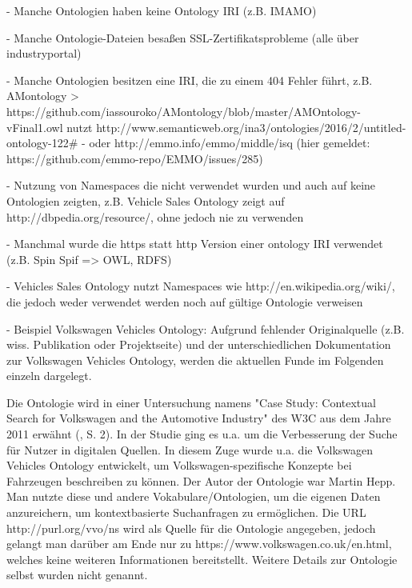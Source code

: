 \documentclass{article}
\begin{document}
- Manche Ontologien haben keine Ontology IRI (z.B. IMAMO)

- Manche Ontologie-Dateien besaßen SSL-Zertifikatsprobleme (alle über industryportal)

- Manche Ontologien besitzen eine IRI, die zu einem 404 Fehler führt, z.B. AMontology > https://github.com/iassouroko/AMontology/blob/master/AMOntology-vFinal1.owl nutzt http://www.semanticweb.org/ina3/ontologies/2016/2/untitled-ontology-122\#
  - oder http://emmo.info/emmo/middle/isq (hier gemeldet: https://github.com/emmo-repo/EMMO/issues/285)

- Nutzung von Namespaces die nicht verwendet wurden und auch auf keine Ontologien zeigten, z.B. Vehicle Sales Ontology zeigt auf http://dbpedia.org/resource/, ohne jedoch nie zu verwenden

- Manchmal wurde die https statt http Version einer ontology IRI verwendet (z.B. Spin Spif => OWL, RDFS)

- Vehicles Sales Ontology nutzt Namespaces wie http://en.wikipedia.org/wiki/, die jedoch weder verwendet werden noch auf gültige Ontologie verweisen

%

  - Beispiel Volkswagen Vehicles Ontology: Aufgrund fehlender Originalquelle (z.B. wiss. Publikation oder Projektseite) und der unterschiedlichen Dokumentation zur Volkswagen Vehicles Ontology, werden die aktuellen Funde im Folgenden einzeln dargelegt.

Die Ontologie wird in einer Untersuchung namens "Case Study: Contextual Search for Volkswagen and the Automotive Industry" des W3C aus dem Jahre 2011 erwähnt (\cite{greenly2011case}, S. 2).
In der Studie ging es u.a. um die Verbesserung der Suche für Nutzer in digitalen Quellen.
In diesem Zuge wurde u.a. die Volkswagen Vehicles Ontology entwickelt, um Volkswagen-spezifische Konzepte bei Fahrzeugen beschreiben zu können.
Der Autor der Ontologie war Martin Hepp.
Man nutzte diese und andere Vokabulare/Ontologien, um die eigenen Daten anzureichern, um kontextbasierte Suchanfragen zu ermöglichen.
Die URL http://purl.org/vvo/ns wird als Quelle für die Ontologie angegeben, jedoch gelangt man darüber am Ende nur zu https://www.volkswagen.co.uk/en.html, welches keine weiteren Informationen bereitstellt.
Weitere Details zur Ontologie selbst wurden nicht genannt.
\end{document}

